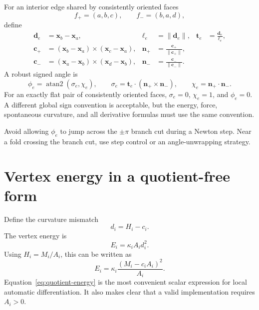 \documentclass[11pt]{article}
\newcommand{\atanTwo}{\operatorname{atan2}}
\begin{document}
For an interior edge shared by consistently oriented faces
\begin{equation}
  f_+=(a,b,c),
  \qquad
  f_-=(b,a,d),
\end{equation}
define
\begin{align}
  \mathbf{d}_e &= \mathbf{x}_b-\mathbf{x}_a,
  &\ell_e&=\|\mathbf{d}_e\|,
  &\mathbf{t}_e&=\frac{\mathbf{d}_e}{\ell_e},\\
  \mathbf{c}_+&=(\mathbf{x}_b-\mathbf{x}_a)\times(\mathbf{x}_c-\mathbf{x}_a),
  &\mathbf{n}_+&=\frac{\mathbf{c}_+}{\|\mathbf{c}_+\|},\\
  \mathbf{c}_-&=(\mathbf{x}_a-\mathbf{x}_b)\times(\mathbf{x}_d-\mathbf{x}_b),
  &\mathbf{n}_-&=\frac{\mathbf{c}_-}{\|\mathbf{c}_-\|}.
\end{align}
A robust signed angle is
\begin{equation}
  \boxed{
  \phi_e=\atanTwo(\sigma_e,\chi_e),
  \qquad
  \sigma_e=\mathbf{t}_e\cdot(\mathbf{n}_+\times\mathbf{n}_-),
  \qquad
  \chi_e=\mathbf{n}_+\cdot\mathbf{n}_-.}
  \label{eq:signed-dihedral}
\end{equation}
For an exactly flat pair of consistently oriented faces, $\sigma_e=0$, $\chi_e=1$, and $\phi_e=0$.  A different global sign convention is acceptable, but the energy, force, spontaneous curvature, and all derivative formulas must use the same convention.

Avoid allowing $\phi_e$ to jump across the $\pm\pi$ branch cut during a Newton step.  Near a fold crossing the branch cut, use step control or an angle-unwrapping strategy.

\section{Vertex energy in a quotient-free form}

Define the curvature mismatch
\begin{equation}
  d_i=H_i-c_i.
\end{equation}
The vertex energy is
\begin{equation}
  E_i=\kappa_iA_i d_i^2.
\end{equation}
Using $H_i=M_i/A_i$, this can be written as
\begin{equation}
  \boxed{
  E_i
  =\kappa_i\frac{(M_i-c_iA_i)^2}{A_i}.}
  \label{eq:quotient-energy}
\end{equation}
Equation~\eqref{eq:quotient-energy} is the most convenient scalar expression for local automatic differentiation.  It also makes clear that a valid implementation requires $A_i>0$.
\end{document}
